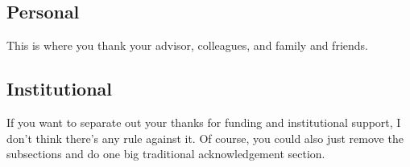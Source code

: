 \begin{acknowledgements}
    \subsection*{Personal}

    This is where you thank your advisor, colleagues, and family and friends.


    \subsection*{Institutional}

    If you want to separate out your thanks for funding and institutional support, I don't think there's any rule against it.
    Of course, you could also just remove the subsections and do one big traditional acknowledgement section.
\end{acknowledgements}

%
%
%
